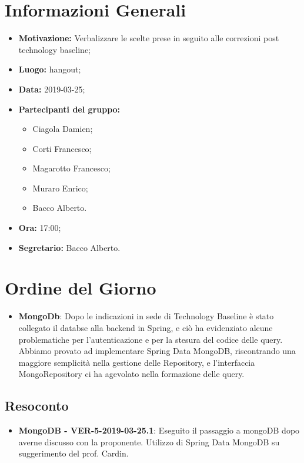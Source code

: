 \documentclass[a4paper, oneside, openany, dvipsnames, table]{article}
\begin{document}
\copertina{}


\newpage
\tableofcontents
\newpage
\section{Informazioni Generali}
\begin{itemize}
\item \textbf{Motivazione:} Verbalizzare le scelte prese in seguito alle correzioni post technology baseline;
\item \textbf{Luogo:} hangout;
\item \textbf{Data:} 2019-03-25;
\item \textbf{Partecipanti del gruppo:} \hfill
	\begin{itemize}
		\item Ciagola Damien;
		\item Corti Francesco;
		\item Magarotto Francesco;
		\item Muraro Enrico;
		\item Bacco Alberto.
	\end{itemize} 
\item \textbf{Ora:} 17:00;
\item \textbf{Segretario:} Bacco Alberto.
\end{itemize}

\section{Ordine del Giorno}
\begin{itemize}
	\item \textbf{MongoDb}: 
	Dopo le indicazioni in sede di Technology Baseline è stato 
	collegato il databse alla backend in Spring, e ciò ha evidenziato
	alcune problematiche per l'autenticazione e per la stesura
	del codice delle query. 
	Abbiamo provato ad implementare Spring Data MongoDB, riscontrando
	una maggiore semplicità nella gestione delle Repository, e
	l'interfaccia MongoRepository ci ha agevolato nella 
	formazione delle query.
\end{itemize}

\subsection{Resoconto}
\begin{itemize}
	\item \textbf{MongoDB - VER-5-2019-03-25.1}: 
	Eseguito il passaggio a mongoDB dopo averne discusso con la 
	proponente. Utilizzo di Spring Data MongoDB su suggerimento del 
	prof. Cardin.
	
	
\end{itemize}
\end{document}

